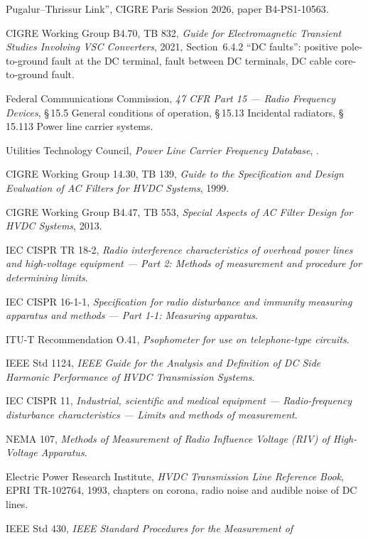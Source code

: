 \begin{enumerate}[label={[\arabic*]}, leftmargin=*, itemsep=0.4em]
        Pugalur--Thrissur Link'', CIGRE Paris Session 2026, paper
        B4-PS1-10563.
  \item CIGRE Working Group B4.70, TB 832, \emph{Guide for Electromagnetic
        Transient Studies Involving VSC Converters}, 2021, Section~6.4.2
        ``DC faults'': positive pole-to-ground fault at the DC terminal,
        fault between DC terminals, DC cable core-to-ground fault.
  \item Federal Communications Commission, \emph{47 CFR Part 15 --- Radio
        Frequency Devices}, \S\,15.5 General conditions of operation,
        \S\,15.13 Incidental radiators, \S\,15.113 Power line carrier systems.
  \item Utilities Technology Council, \emph{Power Line Carrier Frequency
        Database}, .
  \item CIGRE Working Group 14.30, TB 139, \emph{Guide to the Specification and
        Design Evaluation of AC Filters for HVDC Systems}, 1999.
  \item CIGRE Working Group B4.47, TB 553, \emph{Special Aspects of AC Filter
        Design for HVDC Systems}, 2013.
  \item IEC CISPR TR 18-2, \emph{Radio interference characteristics of overhead
        power lines and high-voltage equipment --- Part 2: Methods of
        measurement and procedure for determining limits}.
  \item IEC CISPR 16-1-1, \emph{Specification for radio disturbance and
        immunity measuring apparatus and methods --- Part 1-1: Measuring
        apparatus}.
  \item ITU-T Recommendation O.41, \emph{Psophometer for use on telephone-type
        circuits}.
  \item IEEE Std 1124, \emph{IEEE Guide for the Analysis and Definition of DC
        Side Harmonic Performance of HVDC Transmission Systems}.
  \item IEC CISPR 11, \emph{Industrial, scientific and medical equipment ---
        Radio-frequency disturbance characteristics --- Limits and methods of
        measurement}.
  \item NEMA 107, \emph{Methods of Measurement of Radio Influence Voltage (RIV)
        of High-Voltage Apparatus}.
  \item Electric Power Research Institute, \emph{HVDC Transmission Line
        Reference Book}, EPRI TR-102764, 1993, chapters on corona, radio
        noise and audible noise of DC lines.
  \item IEEE Std 430, \emph{IEEE Standard Procedures for the Measurement of
}
\end{enumerate}
